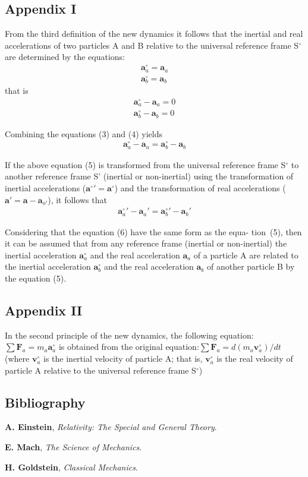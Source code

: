 \documentclass[11pt]{article}
\newcommand{\vV}{\mathbf{v}}
\newcommand{\vA}{\mathbf{a}}
\newcommand{\vF}{\mathbf{F}}
\newcommand{\mM}{m}
\newcommand{\rt}{'}
\newcommand{\ra}{_a}
\newcommand{\rb}{_b}
\newcommand{\rot}{_{o'}}
\begin{document}
\newpage

{\centering\subsection*{Appendix I}}

\par From the third definition of the new dynamics it follows that the inertial and real accelerations of two particles A and B relative to the universal reference frame S$^{\circ}$ are determined by the equations:
\begin{eqnarray}
\vA^{\circ}\ra = \vA\ra \\
\vA^{\circ}\rb = \vA\rb
\end{eqnarray}
\noindent that is
\begin{eqnarray}
\vA^{\circ}\ra - \vA\ra = 0 \\
\vA^{\circ}\rb - \vA\rb = 0
\end{eqnarray}
\par Combining the equations (3) and (4) yields
\begin{eqnarray}
\vA^{\circ}\ra - \vA\ra = \vA^{\circ}\rb - \vA\rb
\end{eqnarray}
\par If the above equation (5) is transformed from the universal reference frame S$^{\circ}$ to another reference frame S' (inertial or non-inertial) using the transformation of inertial accelerations ($\vA^{\circ}{\rt} = \vA^{\circ}$) and the transformation of real accelerations ($\vA\rt = \vA - \vA\rot$), it follows that
\begin{eqnarray}
\vA^{\circ}\ra{\rt} - \vA\ra{\rt} = \vA^{\circ}\rb{\rt} - \vA\rb{\rt}
\end{eqnarray}
\par Considering that the equation (6) have the same form as the equa- \hbox {tion (5)}, then it can be assumed that from any reference frame (inertial or non-inertial) the inertial acceleration $\vA^{\circ}\ra$ and the real acceleration $\vA\ra$ of a particle A are related to the inertial acceleration $\vA^{\circ}\rb$ and the real acceleration $\vA\rb$ of another particle B by the equation (5).

\bigskip

{\centering\subsection*{Appendix II}}

\par In the second principle of the new dynamics, the following equation: $\sum \vF\ra = \mM\ra\vA^{\circ}\ra$ is obtained from the original equation:\hbox {$\sum \vF\ra = d(\mM\ra\vV^{\circ}\ra)/dt$} (where $\vV^{\circ}\ra$ is the inertial velocity of particle A; that is, $\vV^{\circ}\ra$ is the real velocity of particle A relative to the universal reference frame S$^{\circ}$)

\bigskip

{\centering\subsection*{Bibliography}}

\par \textbf{A. Einstein}, \textit{Relativity: The Special and General Theory}.
\bigskip
\par \textbf{E. Mach}, \textit{The Science of Mechanics}.
\bigskip
\par \textbf{H. Goldstein}, \textit{Classical Mechanics}.
\end{document}
